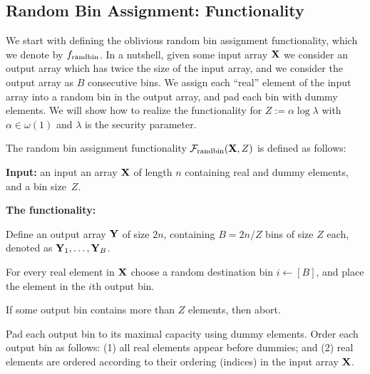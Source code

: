 \subsection{\boldmath Random Bin Assignment: Functionality}
\label{sec:rand:functionality}
We start with defining the oblivious random bin assignment functionality, which we denote by $f_{\rm randbin}$. In a nutshell, given some input array ${\bf X}$ we consider an output array which has twice the size of the input array, and we consider the output array as $B$ consecutive bins. We assign each ``real'' element of the input array into a random bin in the output array, and pad each bin with dummy elements. We will show how to realize the functionality for $Z := \alpha \log \lambda$ with $\alpha \in \omega(1)$ and $\lambda$ is the security parameter. 


\begin{myfunc}
\label{func:bin-assignment}
The random bin assignment functionality ${\cal F}_{\rm randbin}(\mathbf{X},Z)$ is defined as follows:
\begin{MyItemize}
\item {\bf Input:} an input an array $\mathbf{X}$ of length $n$ containing real and dummy elements, and a bin size~$Z$. 
\item {\bf The functionality:} 
\begin{MyEnumerate}
\item Define an output array ${\bf Y}$ of size $2n$, containing $B = 2n/Z$ bins of size $Z$ each, denoted as ${\bf Y}_1,\ldots,{\bf Y}_B$. 
\item For every real element in $\mathbf{X}$ choose a random destination bin $i \gets [B]$, and place the element in the $i$th output bin. 
\item If some output bin contains more than $Z$ elements, then {\sf abort}. 
\item Pad each output bin to its maximal capacity using dummy elements. Order each output bin as follows: 
(1) all real elements appear before dummies;
and (2) real elements are ordered according to their ordering (indices) in the input array $\mathbf{X}$.
\end{MyEnumerate}
\end{MyItemize}
\end{myfunc}


